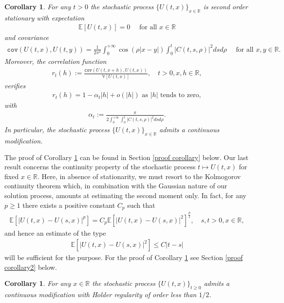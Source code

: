 \documentclass{article}
\newtheorem{corollary}[theorem]{Corollary}
\begin{document}
\begin{corollary}\label{corollary}
For any $t>0$ the stochastic process $\{U(t,x)\}_{x\in\mathbb{R}}$ is second order stationary with expectation
\begin{align*}
\mathbb{E}[U(t,x)]=0\quad\mbox{ for all }x\in\mathbb{R}
\end{align*}
and covariance
\begin{align}\label{cov}
\mathtt{cov}(U(t,x),U(t,y))=\frac{1}{2\pi^2}\int_0^{+\infty}\cos(\rho |x-y|)\int_0^t|C(t,s,\rho)|^2dsd\rho\quad\mbox{ for all }x,y\in\mathbb{R}.
\end{align}
Moreover, the correlation function
\begin{align*}
r_t(h):=\frac{\mathtt{cov}(U(t,x+h),U(t,x))}{\mathbb{V}[U(t,x)]},\quad t>0,x,h\in\mathbb{R},
\end{align*}
verifies
\begin{align*}
r_t(h)=1-\alpha_t|h|+o(|h|)\mbox{ as $|h|$ tends to zero},
\end{align*}
with
\begin{align*}
\alpha_t:=\frac{\pi}{2\int_0^{+\infty}\int_0^{t}\left|C(t,s,\rho)\right|^2ds d\rho}.
\end{align*}
In particular, the stochastic process $\{U(t,x)\}_{x\in\mathbb{R}}$ admits a continuous modification.
\end{corollary}

The proof of Corollary \ref{corollary} can be found in Section \ref{proof corollary} below. Our last result concerns the continuity property of the stochastic process $t\mapsto U(t,x)$ for fixed $x\in\mathbb{R}$. Here, in absence of stationarity, we must resort to the Kolmogorov continuity theorem which, in combination with the Gaussian nature of our solution process, amounts at estimating the second moment only. In fact, for any $p\geq 1$
 there exists a positive constant $C_p$ such that
 \begin{align*}
 \mathbb{E}[|U(t,x)-U(s,x)|^p]=C_p \mathbb{E}[|U(t,x)-U(s,x)|^2]^{\frac{p}{2}},\quad s,t>0,x\in\mathbb{R},
 \end{align*}
and hence an estimate of the type
\begin{align*}
\mathbb{E}[|U(t,x)-U(s,x)|^2]\leq C|t-s|
\end{align*}
will be sufficient for the purpose. For the proof of Corollary \ref{corollary2} see Section \ref{proof corollary2} below.

\begin{corollary}\label{corollary2}
	For any $x\in\mathbb{R}$ the stochastic process $\{U(t,x)\}_{t\geq 0}$ admits a continuous modification with H$\ddot{o}$lder regularity of order less than $1/2$.
\end{corollary}
\end{document}
